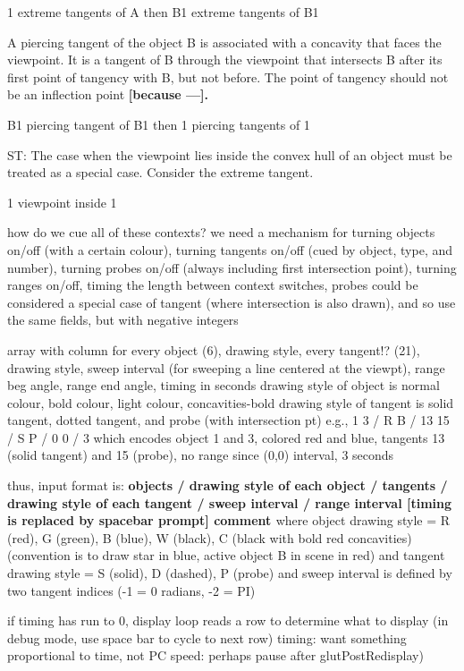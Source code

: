            1      extreme tangents of A   
	      then
	   B1     extreme tangents of B1

    A piercing tangent of the object B is associated with a concavity that faces the viewpoint.
    It is a tangent of B through the viewpoint that intersects B after its first point of tangency
    with B, but not before.
    The point of tangency should not be an inflection point {\bf [because ---].}
    
           B1     piercing tangent of B1
	      then
	   1      piercing tangents of 1

ST: The case when the viewpoint lies inside the convex hull of an object must be treated
    as a special case. Consider the extreme tangent.

           1      viewpoint inside 1

how do we cue all of these contexts?
we need a mechanism for turning objects on/off (with a certain colour), turning tangents on/off 
    (cued by object, type, and number), turning probes on/off (always including first 
    intersection point), turning ranges on/off, timing the length between context switches,
probes could be considered a special case of tangent (where intersection is also drawn),
    and so use the same fields, but with negative integers

array with column for every object (6), drawing style, every tangent!? (21), drawing style,
    sweep interval (for sweeping a line centered at the viewpt),
    range beg angle, range end angle, timing in seconds
drawing style of object is normal colour, bold colour, light colour, concavities-bold
drawing style of tangent is solid tangent, dotted tangent, and probe (with intersection pt)
e.g., 1 3 / R B / 13 15 / S P / 0 0 / 3
  which encodes object 1 and 3, colored red and blue, tangents 13 (solid tangent) and 15 (probe), 
  no range since (0,0) interval, 3 seconds

thus, input format is:
{\bf 
   objects / drawing style of each object / tangents / drawing style of each tangent /
   sweep interval / range interval [timing is replaced by spacebar prompt]
   { comment }
}
where object drawing style = R (red), G (green), B (blue), W (black), 
                             C (black with bold red concavities)
(convention is to draw star in blue, active object B in scene in red)
and tangent drawing style = S (solid), D (dashed), P (probe)
and sweep interval is defined by two tangent indices (-1 = 0 radians, -2 = PI)

if timing has run to 0, display loop reads a row to determine what to display
   (in debug mode, use space bar to cycle to next row)
timing: want something proportional to time, not PC speed: perhaps pause after glutPostRedisplay)

